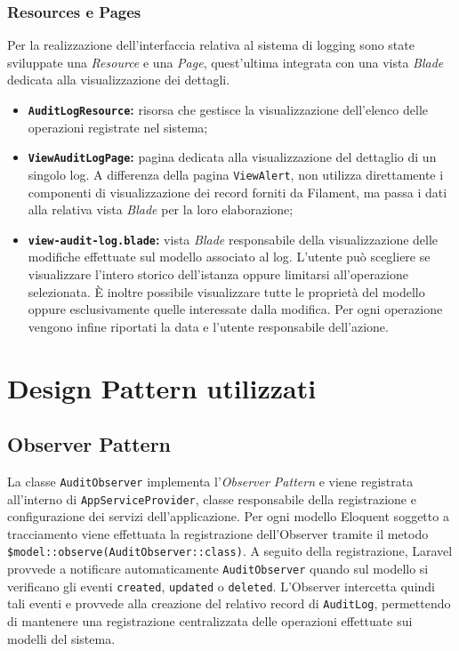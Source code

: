 \subsubsection{Resources e Pages}
Per la realizzazione dell'interfaccia relativa al sistema di logging sono state sviluppate una \textit{Resource} e una \textit{Page}, quest'ultima integrata con una vista 
\textit{Blade} dedicata alla visualizzazione dei dettagli.
\begin{itemize}
  \item \textbf{\texttt{AuditLogResource}:} risorsa che gestisce la visualizzazione dell'elenco delle operazioni registrate nel sistema;
  \item \textbf{\texttt{ViewAuditLogPage}:} pagina dedicata alla visualizzazione del dettaglio di un singolo log. A differenza della pagina \texttt{ViewAlert}, non utilizza 
    direttamente i componenti di visualizzazione dei record forniti da Filament, ma passa i dati alla relativa vista \textit{Blade} per la loro elaborazione;
  \item \textbf{\texttt{view-audit-log.blade}:} vista \textit{Blade} responsabile della visualizzazione delle modifiche effettuate sul modello associato al log. L'utente può 
    scegliere se visualizzare l'intero storico dell'istanza oppure limitarsi all'operazione selezionata. È inoltre possibile visualizzare tutte le proprietà del modello oppure 
    esclusivamente quelle interessate dalla modifica. Per ogni operazione vengono infine riportati la data e l'utente responsabile dell'azione.
\end{itemize}

\section{Design Pattern utilizzati}
\subsection{Observer Pattern}
La classe \texttt{AuditObserver} implementa l'\textit{Observer Pattern} e viene registrata all'interno di \texttt{AppServiceProvider}, classe responsabile della registrazione 
e configurazione dei servizi dell'applicazione. Per ogni modello Eloquent soggetto a tracciamento viene effettuata la registrazione dell'Observer tramite il metodo 
\texttt{\$model::observe(AuditObserver::class)}.
\newline
A seguito della registrazione, Laravel provvede a notificare automaticamente \texttt{AuditObserver} quando sul modello si verificano gli eventi \texttt{created}, 
\texttt{updated} o \texttt{deleted}. L'Observer intercetta quindi tali eventi e provvede alla creazione del relativo record di \texttt{AuditLog}, permettendo di mantenere 
una registrazione centralizzata delle operazioni effettuate sui modelli del sistema.

